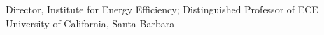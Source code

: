 %
{Director, Institute for Energy Efficiency; Distinguished Professor of ECE}%
{University of California, Santa Barbara}%
{\quad{}}